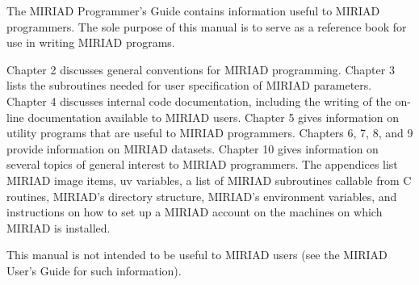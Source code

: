 The MIRIAD Programmer's Guide contains information useful to
MIRIAD programmers.  The sole purpose of this manual is to serve
as a reference book for use in writing MIRIAD programs.

\par Chapter 2 discusses general conventions for MIRIAD programming.
Chapter 3 lists the subroutines needed for user specification of MIRIAD
parameters.  Chapter 4 discusses internal code documentation, including
the writing of the on-line documentation available to MIRIAD users.
Chapter 5 gives information on utility programs that are useful to MIRIAD
programmers.  Chapters 6, 7, 8, and 9 provide information on MIRIAD datasets.
Chapter 10 gives information on several topics of general interest to MIRIAD
programmers.  The appendices list MIRIAD image items, uv variables, a list of
MIRIAD subroutines callable from C routines, MIRIAD's directory structure,
MIRIAD's environment variables, and instructions on how to set up a MIRIAD
account on the machines on which MIRIAD is installed.

\par This manual is not intended to be useful to MIRIAD users
(see the MIRIAD User's Guide for such information).
